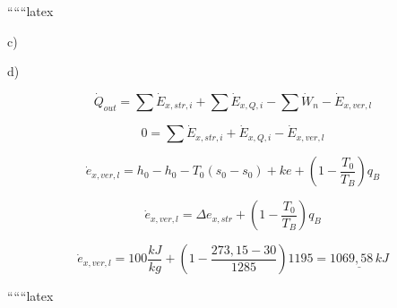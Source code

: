 ``````latex


c)

d)

\begin{equation*}
\dot{Q}_{out} = \sum \dot{E}_{x,str,i} + \sum \dot{E}_{x,Q,i} - \sum \dot{W}_n - \dot{E}_{x,ver,l}
\end{equation*}

\begin{equation*}
0 = \sum \dot{E}_{x,str,i} + \dot{E}_{x,Q,i} - \dot{E}_{x,ver,l}
\end{equation*}

\begin{equation*}
\dot{e}_{x,ver,l} = h_0 - h_0 - T_0(s_0 - s_0) + ke + \left(1 - \frac{T_0}{T_B}\right)q_B
\end{equation*}

\begin{equation*}
\dot{e}_{x,ver,l} = \Delta e_{x,str} + \left(1 - \frac{T_0}{T_B}\right)q_B
\end{equation*}

\begin{equation*}
\dot{e}_{x,ver,l} = 100 \frac{kJ}{kg} + \left(1 - \frac{273,15 - 30}{1285}\right)1195 = \underline{1069,58 \, kJ}
\end{equation*}

``````latex


